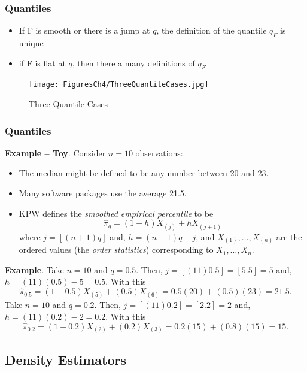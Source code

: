 \documentclass[]{book}
\begin{document}
\subsubsection{Quantiles}\label{quantiles-2}

\begin{itemize}
\item
  If F is smooth or there is a jump at \(q\), the definition of the
  quantile \(q_F\) is unique
\item
  if F is flat at \(q\), then there a many definitions of \(q_F\)
\end{itemize}

\begin{figure}
\centering
\texttt{[image: FiguresCh4/ThreeQuantileCases.jpg]}
\caption{Three Quantile Cases}
\end{figure}

\subsubsection{Quantiles}\label{quantiles-3}

\textbf{Example -- Toy}. Consider \(n=10\) observations:

\begin{itemize}
\item
  The median might be defined to be any number between 20 and 23.
\item
  Many software packages use the average 21.5.
\item
  KPW defines the \emph{smoothed empirical percentile} to be
  \[\hat{\pi}_q = (1-h) X_{(j)} + h X_{(j+1)}\] where \(j=[(n+1)q]\)
  and, \(h=(n+1)q-j\), and \(X_{(1)}, \ldots, X_{(n)}\) are the ordered
  values (the \emph{order statistics}) corresponding to
  \(X_1, \ldots, X_n\).
\end{itemize}

\textbf{Example}. Take \(n=10\) and \(q=0.5\). Then,
\(j=[(11)0.5]=[5.5]=5\) and, \(h=(11)(0.5)-5=0.5\). With this
\[\hat{\pi}_{0.5} = (1-0.5) X_{(5)} + (0.5) X_{(6)} = 0.5 (20) + (0.5)(23) = 21.5.\]
Take \(n=10\) and \(q=0.2\). Then, \(j=[(11)0.2]=[2.2]=2\) and,
\(h=(11)(0.2)-2=0.2\). With this
\[\hat{\pi}_{0.2} = (1-0.2) X_{(2)} + (0.2) X_{(3)} = 0.2 (15) + (0.8)(15) = 15.\]

\subsection{Density Estimators}\label{density-estimators}
\end{document}
